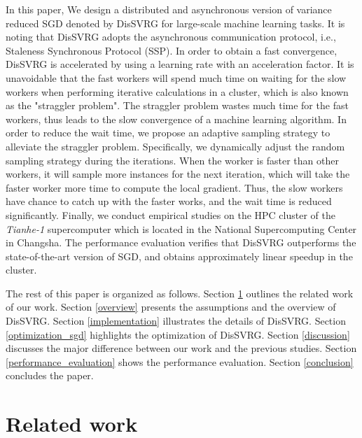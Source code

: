 \documentclass[preprint,review,11pt,a4paper]{elsarticle}
\begin{document}
In this paper, We design a distributed and asynchronous version of variance reduced SGD denoted by DisSVRG for large-scale machine learning tasks. It is noting that DisSVRG adopts the asynchronous communication protocol, i.e., Staleness Synchronous Protocol (SSP). In order to obtain a fast convergence, DisSVRG is accelerated by using a learning rate with an acceleration factor. It is unavoidable that the fast workers will spend much time on waiting for the slow workers when performing iterative calculations  in a cluster, which is also known as the "straggler problem". The straggler problem wastes much time for the fast workers, thus leads to the slow convergence of a machine learning algorithm. In order to reduce the wait time, we propose an adaptive sampling strategy to alleviate the straggler problem. Specifically, we dynamically adjust the random sampling strategy during the iterations. When the worker is faster than other workers, it will  sample more instances for the next iteration, which will take the faster worker more time to compute the local gradient.   Thus, the slow workers have chance to catch up with the faster works, and  the wait time is reduced significantly. Finally, we conduct empirical studies on the HPC cluster of the \emph{Tianhe-1} supercomputer which is located in the National Supercomputing Center in Changsha. The performance evaluation verifies that DisSVRG outperforms the state-of-the-art version of SGD, and obtains approximately linear speedup in the cluster.

The rest of this paper is organized as follows. Section \ref{related_work} outlines the related work of our work. Section \ref{overview} presents the assumptions and the overview of DisSVRG. Section \ref{implementation} illustrates the details of DisSVRG. Section \ref{optimization_sgd} highlights the  optimization of DisSVRG. Section \ref{discussion} discusses the major difference between our work and the previous studies. Section \ref{performance_evaluation} shows the performance evaluation. Section \ref{conclusion} concludes the paper.

\section{Related work}
\label{related_work}
\end{document}
